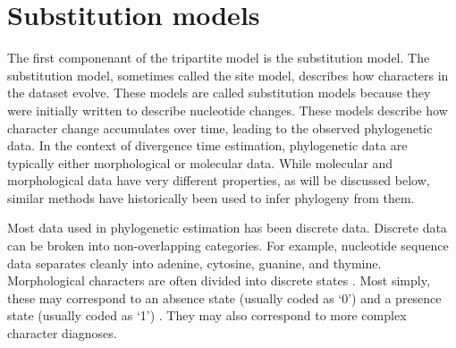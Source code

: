 \documentclass[11pt]{article}
\begin{document}


\section{Substitution models}

The first componenant of the tripartite model is the substitution model.
The substitution model, sometimes called the site model, describes how characters in the dataset evolve.
These models are called substitution models because they were initially written to describe nucleotide changes.
These models describe how character change accumulates over time, leading to the observed phylogenetic data.
In the context of divergence time estimation, phylogenetic data are typically either morphological or molecular data. 
While molecular and morphological data have very different properties, as will be discussed below, similar methods have historically been used to infer phylogeny from them.

Most data used in phylogenetic estimation has been discrete data.
Discrete data can be broken into non-overlapping categories.
For example, nucleotide sequence data separates cleanly into adenine, cytosine, guanine, and thymine.
Morphological characters are often divided into discrete states \cite{de1985ontogenetic}.
Most simply, these may correspond to an absence state (usually coded as `0') and a presence state (usually coded as `1') \cite{watrous1981}.
They may also correspond to more complex character diagnoses.
\end{document}
